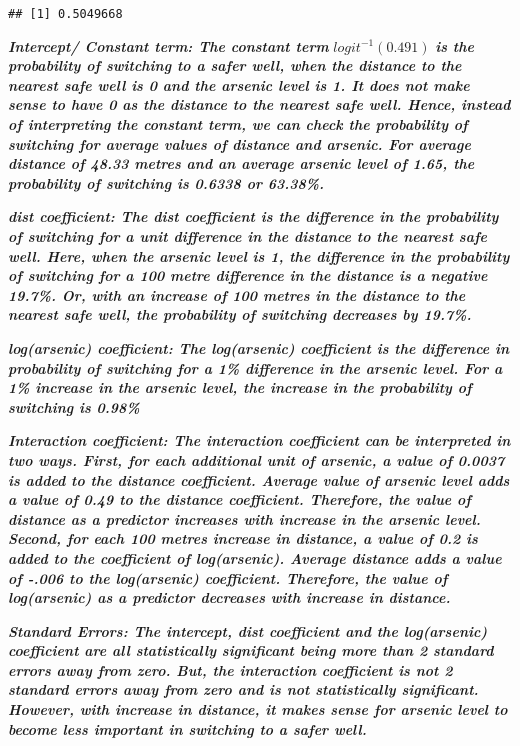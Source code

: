 \documentclass[]{article}
\begin{document}
\begin{verbatim}
## [1] 0.5049668
\end{verbatim}

\textbf{\emph{Intercept/ Constant term: The constant term}}
\(logit^{-1}(0.491)\) \textbf{\emph{is the probability of switching to a
safer well, when the distance to the nearest safe well is 0 and the
arsenic level is 1. It does not make sense to have 0 as the distance to
the nearest safe well. Hence, instead of interpreting the constant term,
we can check the probability of switching for average values of distance
and arsenic. For average distance of 48.33 metres and an average arsenic
level of 1.65, the probability of switching is 0.6338 or 63.38\%.}}

\textbf{\emph{dist coefficient: The dist coefficient is the difference
in the probability of switching for a unit difference in the distance to
the nearest safe well. Here, when the arsenic level is 1, the difference
in the probability of switching for a 100 metre difference in the
distance is a negative 19.7\%. Or, with an increase of 100 metres in the
distance to the nearest safe well, the probability of switching
decreases by 19.7\%.}}

\textbf{\emph{log(arsenic) coefficient: The log(arsenic) coefficient is
the difference in probability of switching for a 1\% difference in the
arsenic level. For a 1\% increase in the arsenic level, the increase in
the probability of switching is 0.98\%}}

\textbf{\emph{Interaction coefficient: The interaction coefficient can
be interpreted in two ways. First, for each additional unit of arsenic,
a value of 0.0037 is added to the distance coefficient. Average value of
arsenic level adds a value of 0.49 to the distance coefficient.
Therefore, the value of distance as a predictor increases with increase
in the arsenic level. Second, for each 100 metres increase in distance,
a value of 0.2 is added to the coefficient of log(arsenic). Average
distance adds a value of -.006 to the log(arsenic) coefficient.
Therefore, the value of log(arsenic) as a predictor decreases with
increase in distance.}}

\textbf{\emph{Standard Errors: The intercept, dist coefficient and the
log(arsenic) coefficient are all statistically significant being more
than 2 standard errors away from zero. But, the interaction coefficient
is not 2 standard errors away from zero and is not statistically
significant. However, with increase in distance, it makes sense for
arsenic level to become less important in switching to a safer well.}}
\end{document}
